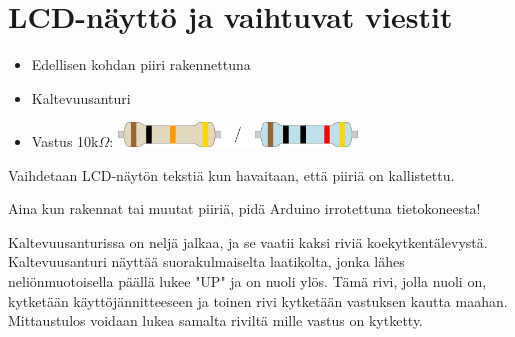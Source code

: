 \section{LCD-näyttö ja vaihtuvat viestit}
\begin{minipage}{0.5\textwidth}
\begin{tcolorbox}[colback=lime!10,title=Tarvikkeet, colbacktitle=green!10,coltitle=black]
\begin{itemize}
    \item Edellisen kohdan piiri rakennettuna
    \item Kaltevuusanturi
    \item Vastus 10k$\Omega$: \includegraphics[width=0.5\textwidth]{kuvat/10k.pdf}
\end{itemize}
\end{tcolorbox}
\end{minipage}
\begin{minipage}{0.5\textwidth}
\begin{tcolorbox}[colback=blue!10,title=Piirin toiminta,colbacktitle=purple!90]
Vaihdetaan LCD-näytön tekstiä kun havaitaan, että piiriä on kallistettu.
\end{tcolorbox}
\end{minipage}

\begin{tcolorbox}[colback=red!10,colbacktitle=red,title=HUOM!]
Aina kun rakennat tai muutat piiriä, pidä Arduino irrotettuna tietokoneesta! 
\end{tcolorbox}

\begin{tcolorbox}[title=Kaltevuusanturin kytkeminen,colback=blue!10,colbacktitle=purple!90]
Kaltevuusanturissa on neljä jalkaa, ja se vaatii kaksi riviä koekytkentälevystä. Kaltevuusanturi näyttää suorakulmaiselta laatikolta, jonka lähes neliönmuotoisella päällä lukee "UP" ja on nuoli ylös. Tämä rivi, jolla nuoli on, kytketään käyttöjännitteeseen ja toinen rivi kytketään vastuksen kautta maahan. Mittaustulos voidaan lukea samalta riviltä mille vastus on kytketty.  


\end{tcolorbox}

